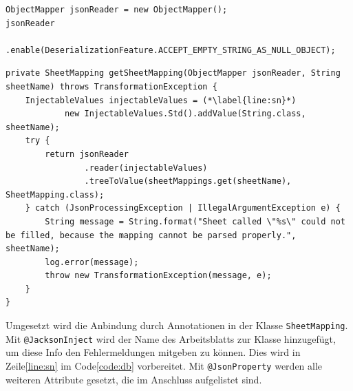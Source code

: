 \begin{lstlisting}[emph={jsonReader}]
ObjectMapper jsonReader = new ObjectMapper();
jsonReader
		.enable(DeserializationFeature.ACCEPT_EMPTY_STRING_AS_NULL_OBJECT);
\end{lstlisting}
\begin{lstlisting}[emph={jsonReader, sheetName, injextableValues, e, message, sheetMappings, log}, firstnumber=last, caption={Datenbindung für Arbeitsblätter der Mapping-Datei}, label=code:db]
private SheetMapping getSheetMapping(ObjectMapper jsonReader, String sheetName) throws TransformationException {
	InjectableValues injectableValues = (*\label{line:sn}*)
			new InjectableValues.Std().addValue(String.class, sheetName);
	try {
		return jsonReader
				.reader(injectableValues)
				.treeToValue(sheetMappings.get(sheetName), SheetMapping.class);
	} catch (JsonProcessingException | IllegalArgumentException e) {
		String message = String.format("Sheet called \"%s\" could not be filled, because the mapping cannot be parsed properly.", sheetName);
		log.error(message);
		throw new TransformationException(message, e);
	}
}
\end{lstlisting}
Umgesetzt wird die Anbindung durch Annotationen in der Klasse \texttt{SheetMapping}. Mit \texttt{@JacksonInject} wird der Name des Arbeitsblatts zur Klasse hinzugefügt, um diese Info den Fehlermeldungen mitgeben zu können. Dies wird in Zeile\nbs\ref{line:sn} im Code\nbs\ref{code:db} vorbereitet. Mit \texttt{@JsonProperty} werden alle weiteren Attribute gesetzt, die im Anschluss aufgelistet sind. 
